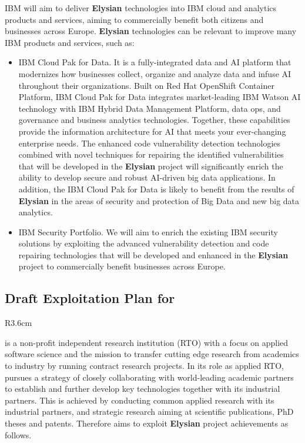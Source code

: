 \documentclass[a4paper,11pt]{article}
\newcommand{\project}[1]{\textbf{#1}\xspace}
\newcommand{\SECURITY}{\project{Elysian}}
\newcommand{\TheProject}{\SECURITY}
\begin{document}
IBM will aim to deliver \TheProject technologies into IBM cloud and analytics products and services, aiming to commercially benefit both citizens and businesses across Europe. \TheProject technologies can be relevant to improve many IBM products and services, such as:
\begin{itemize}
    \item IBM Cloud Pak for Data. It is a fully-integrated data and AI platform that modernizes how businesses collect, organize and analyze data and infuse AI throughout their organizations. Built on Red Hat OpenShift Container Platform, IBM Cloud Pak for Data integrates market-leading IBM Watson AI technology with IBM Hybrid Data Management Platform, data ops, and governance and business analytics technologies. Together, these capabilities provide the information architecture for AI that meets your ever-changing enterprise needs. The enhanced code vulnerability detection technologies combined with novel techniques for repairing the identified vulnerabilities that will be developed in the \TheProject project will significantly enrich the ability to develop secure and robust AI-driven big data applications. In addition, the IBM Cloud Pak for Data is likely to benefit from the results of \TheProject in the areas of security and protection of Big Data and new big data analytics.
    \item IBM Security Portfolio. We will aim to enrich the existing IBM security solutions by exploiting the advanced vulnerability detection and code repairing technologies that will be developed and enhanced in the \TheProject project to commercially benefit businesses across Europe.
\end{itemize}

\horizontalline

\subsection*{Draft Exploitation Plan for \SCCHshort{}}
\vspace{-6pt}

\begin{wrapfigure}{R}{3.6cm}
\vspace{-1.3cm}
\hfill {}
\vspace{-0.8cm}
\end{wrapfigure}


\SCCHlong{} is a non-profit independent research institution (RTO) with a focus on applied software science and the mission to transfer cutting edge research from academics to industry by running contract research projects. In its role as applied RTO, \SCCHshort{} pursues a strategy of closely collaborating with world-leading academic partners to establish and further develop key technologies together with its industrial partners. This is achieved by conducting common applied research with its industrial partners, and strategic research aiming at scientific publications, PhD theses and patents. Therefore \SCCHshort{} aims to exploit \TheProject{} project achievements as follows.
\end{document}
